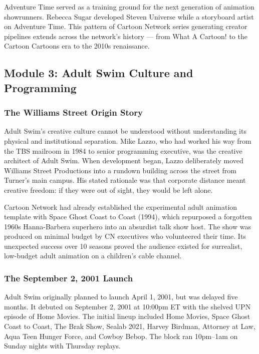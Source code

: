\documentclass[11pt,letterpaper]{article}
\begin{document}
Adventure Time served as a training ground for the next generation of animation showrunners. Rebecca Sugar developed Steven Universe while a storyboard artist on Adventure Time. This pattern of Cartoon Network series generating creator pipelines extends across the network's history --- from What A Cartoon! to the Cartoon Cartoons era to the 2010s renaissance.

\subsection{Module 3: Adult Swim Culture and Programming}

\subsubsection{The Williams Street Origin Story}

Adult Swim's creative culture cannot be understood without understanding its physical and institutional separation. Mike Lazzo, who had worked his way from the TBS mailroom in 1984 to senior programming executive, was the creative architect of Adult Swim. When development began, Lazzo deliberately moved Williams Street Productions into a rundown building across the street from Turner's main campus. His stated rationale was that corporate distance meant creative freedom: if they were out of sight, they would be left alone.

Cartoon Network had already established the experimental adult animation template with Space Ghost Coast to Coast (1994), which repurposed a forgotten 1960s Hanna-Barbera superhero into an absurdist talk show host. The show was produced on minimal budget by CN executives who volunteered their time. Its unexpected success over 10 seasons proved the audience existed for surrealist, low-budget adult animation on a children's cable channel.

\subsubsection{The September 2, 2001 Launch}

Adult Swim originally planned to launch April 1, 2001, but was delayed five months. It debuted on September 2, 2001 at 10:00pm ET with the shelved UPN episode of Home Movies. The initial lineup included Home Movies, Space Ghost Coast to Coast, The Brak Show, Sealab 2021, Harvey Birdman, Attorney at Law, Aqua Teen Hunger Force, and Cowboy Bebop. The block ran 10pm--1am on Sunday nights with Thursday replays.
\end{document}
